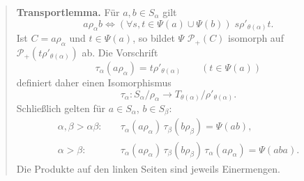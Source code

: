 \documentclass[main.tex]{subfiles}
\begin{document}
\begin{quote}
\textbf{Transportlemma.}
Für \(a,b\in S_\alpha\) gilt
\[
 a\mathrel{\rho_\alpha}b
 \iff
 (\forall s,t\in\Psi(a)\cup\Psi(b))\;
 s\mathrel{\rho'_{\theta(\alpha)}}t.                    \tag{25.15}
\]
Ist \(C=a\rho_\alpha\) und \(t\in\Psi(a)\), so bildet \(\Psi\)
\(\mathcal P_+(C)\) isomorph auf
\(\mathcal P_+(t\rho'_{\theta(\alpha)})\) ab.  Die Vorschrift
\[
 \tau_\alpha(a\rho_\alpha)
   =t\rho'_{\theta(\alpha)}\qquad(t\in\Psi(a))            \tag{25.16}
\]
definiert daher einen Isomorphismus
\[
 \tau_\alpha\colon S_\alpha/\rho_\alpha
    \longrightarrow T_{\theta(\alpha)}/\rho'_{\theta(\alpha)}.
                                                                  \tag{25.17}
\]
Schließlich gelten für \(a\in S_\alpha\), \(b\in S_\beta\):
\begin{align}
 \alpha,\beta>\alpha\beta:\quad&
 \tau_\alpha(a\rho_\alpha)\,
 \tau_\beta(b\rho_\beta)=\Psi(ab),                       \tag{25.18}\\[2mm]
 \alpha>\beta:\quad&
 \tau_\alpha(a\rho_\alpha)\,
 \tau_\beta(b\rho_\beta)\,
 \tau_\alpha(a\rho_\alpha)=\Psi(aba).                    \tag{25.19}
\end{align}
Die Produkte auf den linken Seiten sind jeweils Einermengen.
\end{quote}
\end{document}
